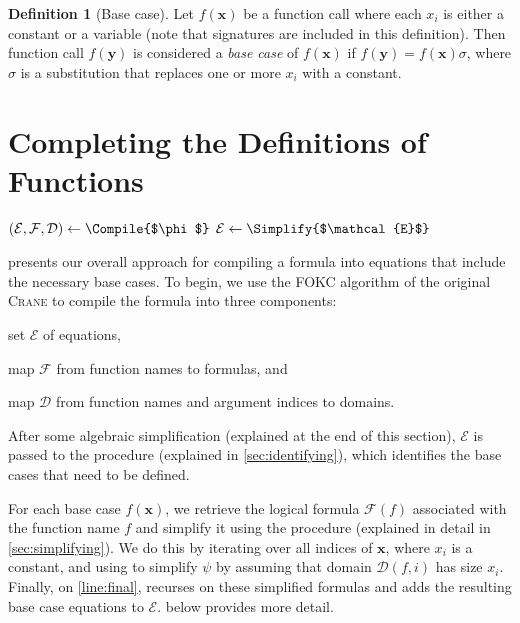 \documentclass[letterpaper]{article} %
\theoremstyle{remark}
\theoremstyle{definition}
\newtheorem{definition}{Definition}
\begin{document}
\begin{definition}[Base case]\label{def:basecase}
  Let $f(\mathbf{x})$ be a function call where each $x_{i}$ is either a constant
  or a variable (note that signatures are included in this definition). Then
  function call $f(\mathbf{y})$ is considered a \emph{base case} of
  $f(\mathbf{x})$ if $f(\mathbf{y}) = f(\mathbf{x})\sigma$, where $\sigma$ is a
  substitution that replaces one or more $x_{i}$ with a constant.
\end{definition}

\section{Completing the Definitions of Functions}\label{sec:main}

\begin{algorithm}[t]
  \caption{\protect\CompileWithBaseCases{$\phi$}}\label{alg:compilewithbasecases}
  $(\mathcal{E}, \mathcal{F}, \mathcal{D}) \gets \Compile{$\phi$}$\;\label{line:first}
  $\mathcal{E} \gets \Simplify{$\mathcal{E}$}$\;\label{line:second}
\end{algorithm}

 presents our overall approach for compiling a
formula into equations that include the necessary base cases. To begin, we use
the FOKC algorithm of the original \textsc{Crane} to compile the formula into
three components:
\begin{enumerate*}[label=(\roman*)]
  \item set $\mathcal{E}$ of equations,
  \item map $\mathcal{F}$ from function names to formulas, and
  \item map $\mathcal{D}$ from function names and argument indices to domains.
\end{enumerate*}
After some algebraic simplification (explained at the end of this section),
$\mathcal{E}$ is passed to the \FindBaseCases procedure (explained in
\cref{sec:identifying}), which identifies the base cases that need to be
defined.

For each base case $f(\mathbf{x})$, we retrieve the logical formula
$\mathcal{F}(f)$ associated with the function name $f$ and simplify it using the
\Propagate procedure (explained in detail in \cref{sec:simplifying}). We do this
by iterating over all indices of $\mathbf{x}$, where $x_{i}$ is a constant, and
using \Propagate to simplify $\psi$ by assuming that domain $\mathcal{D}(f, i)$
has size $x_{i}$. Finally, on \cref{line:final}, \CompileWithBaseCases recurses
on these simplified formulas and adds the resulting base case equations to
$\mathcal{E}$.  below provides more detail.
\end{document}
